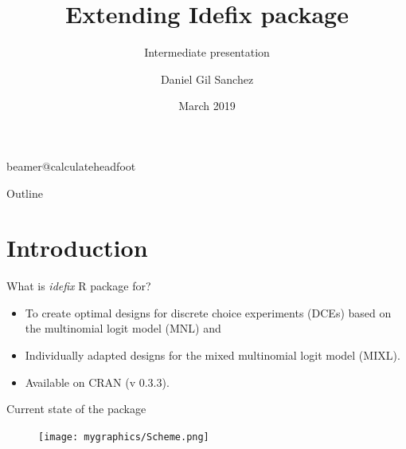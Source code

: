 \documentclass[11pt,t]{beamer}
\title[Extending Idefix package]{Extending Idefix package} %
\subtitle{Intermediate presentation}
\author{Daniel Gil Sanchez}
\institute{KU Leuven}
\date{March 2019}
\begin{document}
\csname beamer@calculateheadfoot\endcsname %


\begin{frame}
	\titlepage
\end{frame}
	

\begin{frame}{Outline}
	\hfill	{\large \parbox{.961\textwidth}{\tableofcontents[hideothersubsections]}}
\end{frame}

\section{Introduction}
\begin{frame}[fragile]{What is \textit{idefix} R package for?}
	\begin{itemize}
		\item To create optimal designs for discrete choice experiments (DCEs) based on the multinomial logit model (MNL) and
		\item Individually adapted designs for the mixed multinomial logit model (MIXL).
		\item Available on CRAN (v 0.3.3).
	\end{itemize}	
\end{frame}

\begin{frame}[fragile]{Current state of the package}

\begin{figure}
			\centering
			\texttt{[image: mygraphics/Scheme.png]}
		\end{figure}
\end{frame}
\end{document}
